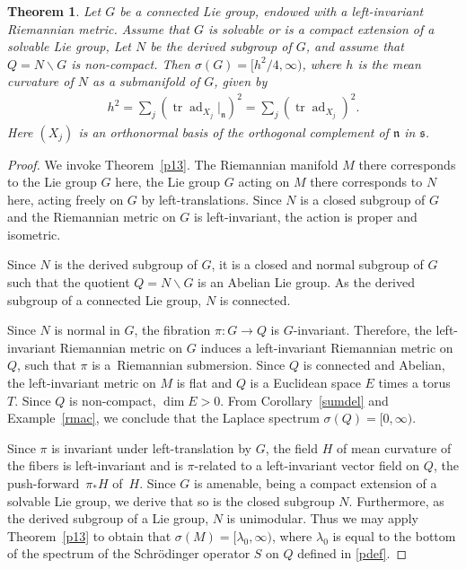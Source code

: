 \documentclass[10pt,a4paper]{amsart}
\numberwithin{equation}{section}
\newtheorem{Theorem}{Theorem}[section]
\DeclareMathOperator{\ad}{ad}
\DeclareMathOperator{\tr}{tr}
\begin{document}
\begin{Theorem}\label{specsn}
Let $G$ be a connected Lie group, endowed with a left-invariant Riemannian metric.
Assume that $G$ is solvable or is a compact extension of a solvable Lie group,
Let $N$ be the derived subgroup of $G$, and assume that $Q=N\backslash G$ is non-compact.
Then $\sigma(G)=\bigl[h^2/4,\infty\bigr)$, where $h$ is the mean curvature of $N$ as a submanifold of $G$,
given by
\begin{align*}
	h^2 = \sum_j (\tr\ad_{X_j}|_{\mathfrak n})^2
	= \sum_j (\tr\ad_{X_j})^2.
\end{align*}
Here $(X_j)$ is an orthonormal basis of the orthogonal complement of $\mathfrak n$ in $\mathfrak s$.
\end{Theorem}

\begin{proof}
We invoke Theorem~\ref{p13}.
The Riemannian manifold $M$ there corresponds to the Lie group $G$ here,
the Lie group $G$ acting on $M$ there corresponds to $N$ here, acting freely on $G$ by left-translations.
Since $N$ is a closed subgroup of $G$ and the Riemannian metric on $G$ is left-invariant,
the action is proper and isometric.

Since $N$ is the derived subgroup of $G$, it is a closed and normal subgroup of $G$
such that the quotient $Q=N\backslash G$ is an Abelian Lie group.
As the derived subgroup of a connected Lie group, $N$ is connected.

Since $N$ is normal in $G$, the fibration $\pi\colon G\to Q$ is $G$-invariant.
Therefore, the left-invariant Riemannian metric on $G$ induces a left-invariant Riemannian metric on $Q$,
such that $\pi$ is a~Riemannian submersion.
Since $Q$ is connected and Abelian, the left-invariant metric on $M$ is flat
and $Q$ is a Euclidean space $E$ times a torus $T$.
Since $Q$ is non-compact, $\dim E>0$.
From Corollary~\ref{sumdel} and Example~\ref{rmac},
we conclude that the Laplace spectrum $\sigma(Q)=[0,\infty)$.

Since $\pi$ is invariant under left-translation by $G$,
the field $H$ of mean curvature of the fibers is left-invariant and is $\pi$-related
to a left-invariant vector field on $Q$, the push-forward~$\pi_*H$ of~$H$.
Since $G$ is amenable, being a compact extension of a solvable Lie group,
we derive that so is the closed subgroup $N$.
Furthermore, as the derived subgroup of a Lie group, $N$ is unimodular.
Thus we may apply Theorem~\ref{p13} to obtain that $\sigma(M)=[\lambda_0,\infty)$,
where $\lambda_0$ is equal to the bottom of the spectrum of the Schr\"odinger operator $S$ on $Q$ defined in \eqref{pdef}.


\end{proof}
\end{document}
